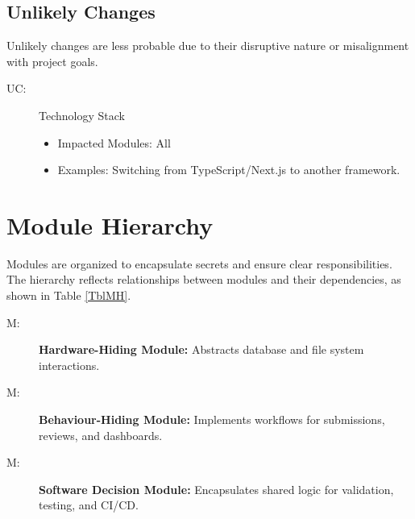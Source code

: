 \documentclass[12pt, titlepage]{article}
\newcounter{ucnum}
\newcommand{\uctheucnum}{UC\theucnum}
\newcounter{mnum}
\newcommand{\mthemnum}{M\themnum}
\begin{document}
\subsection{Unlikely Changes} \label{SecUchange}

Unlikely changes are less probable due to their disruptive nature or misalignment with project goals.

\begin{description}
\item[ \uctheucnum \label{ucTechStack}:] Technology Stack
\begin{itemize}
    \item Impacted Modules: All
    \item Examples: Switching from TypeScript/Next.js to another framework.
\end{itemize}
\end{description}

\section{Module Hierarchy} \label{SecMH}

Modules are organized to encapsulate secrets and ensure clear responsibilities. The hierarchy reflects relationships between modules and their dependencies, as shown in Table \ref{TblMH}.

\begin{description}
\item [ \mthemnum \label{mHH}:] 
\textbf{Hardware-Hiding Module:} Abstracts database and file system interactions.
\item [ \mthemnum \label{mBH}:] 
\textbf{Behaviour-Hiding Module:} Implements workflows for submissions, reviews, and dashboards.
\item [ \mthemnum \label{mSD}:] 
\textbf{Software Decision Module:} Encapsulates shared logic for validation, testing, and CI/CD.
\end{description}
\end{document}
